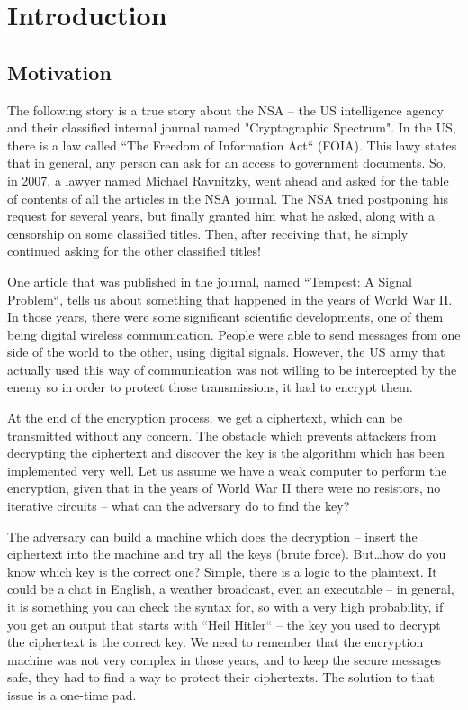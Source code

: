 \chapter{Introduction} \label{chap:c1_IntroductionAOI}

\section{Motivation} \label{sec:Motivation} %

The following story is a true story about the NSA – the US intelligence agency
and their classified internal journal named "Cryptographic Spectrum".
In the US, there is a law called ``The Freedom of Information Act`` (FOIA). This lawy states that in general, any person can ask for an access to government documents.
So, in 2007, a lawyer named Michael Ravnitzky, went ahead and asked for the table of
contents of all the articles in the NSA journal. The NSA tried postponing his request for several years, but finally granted him what he asked, along with a censorship on some classified titles. Then, after receiving that, he simply continued asking for the other classified titles!

One article that was published in the journal, named ``Tempest: A Signal Problem``,
tells us about something that happened in the years of World War II. In those years,
there were some significant scientific developments, one of them being digital wireless
communication. People were able to send messages from one side of the world to the other, using digital signals. However, the US army that actually used this way of communication was not willing to be intercepted by the enemy so in order to protect those transmissions, it had to encrypt them. 

At the end of the encryption process, we get a ciphertext, which can be
transmitted without any concern. The obstacle which prevents attackers from
decrypting the ciphertext and discover the key is the algorithm which has been
implemented very well. Let us assume we have a weak computer to perform the
encryption, given that in the years of World War II there were no resistors, no
iterative circuits – what can the adversary do to find the key?

The adversary can build a machine which does the decryption – insert the
ciphertext into the machine and try all the keys (brute force). But\ldots how do
you know which key is the correct one? Simple, there is a logic to the plaintext.
It could be a chat in English, a weather broadcast, even an executable – in general, it is
something you can check the syntax for, so with a very high probability, if you get
an output that starts with ``Heil Hitler`` –  the key you used to decrypt the
ciphertext is the correct key. We need to remember that the encryption machine
was not very complex in those years, and to keep the secure messages safe, they
had to find a way to protect their ciphertexts. The solution to that issue is a
one-time pad.

